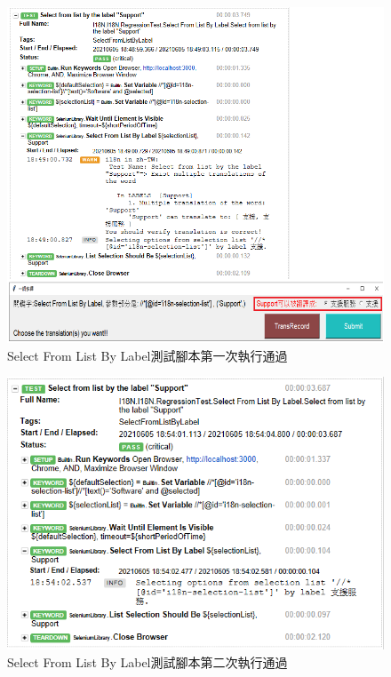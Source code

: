 \begin{figure}[H]
\centering
\includegraphics[width= .9\textwidth]{../論文截圖/4.1.4-2 select from list by label 1st run.png}
\caption{Select From List By Label測試腳本第一次執行通過}
\label{Select From List By Label測試腳本第一次執行通過}
\end{figure}

\begin{figure}[H]
\centering
\includegraphics[width= .8\textwidth]{../論文截圖/4.1.4-3 select from list by label 2nd run.png}
\caption{Select From List By Label測試腳本第二次執行通過}
\label{Select From List By Label測試腳本第二次執行通過}
\end{figure}

\hspace*{\fill} \\
\\ \hspace*{\fill} \\
\\ \hspace*{\fill} \\
\\ \hspace*{\fill} \\
\\ \hspace*{\fill} \\
